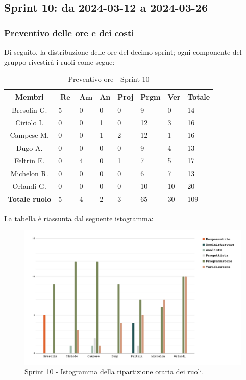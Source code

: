 \documentclass[10pt, a4paper]{article}
\begin{document}
\subsection{Sprint 10: da 2024-03-12 a 2024-03-26}

\subsubsection{Preventivo delle ore e dei costi}
Di seguito, la distribuzione delle ore del decimo sprint; ogni componente del gruppo rivestirà i ruoli come segue:
\begin{table}[H]
\begin{tabularx}{\textwidth}{c|X|X|X|X|X|X|X}
    \textbf{Membri} & $\operatorname{\textbf{Re}}$ & $\mathrm{\textbf{Am}}$ & \textbf{An} & \textbf{Proj} & \textbf{Prgm} & \textbf{Ver} & \textbf{Totale} \\
        \hline Bresolin G. & \cellcolor{primarycolor}5 & 0 & 0 & 0 & 9 & 0 & 14 \\
        \hline Ciriolo I.  & 0 & 0 & 1 & 0 & \cellcolor{primarycolor}12 & 3 & 16 \\
        \hline Campese M.  & 0 & 0 & 1 & 2 & \cellcolor{primarycolor}12 & 1 & 16 \\
        \hline Dugo A.     & 0 & 0 & 0 & 0 & \cellcolor{primarycolor}9 & 4 & 13 \\
        \hline Feltrin E.  & 0 & 4 & 0 & 1 & 7 & \cellcolor{primarycolor}5 & 17 \\
        \hline Michelon R. & 0 & 0 & 0 & 0 & 6 & \cellcolor{primarycolor}7 & 13 \\
        \hline Orlandi G.  & 0 & 0 & 0 & 0 & 10 & \cellcolor{primarycolor}10 & 20 \\
        \hline
        \textbf{Totale ruolo} & 5 & 4 & 2 & 3 & 65 & 30 & 109 
    \end{tabularx}
    \caption{Preventivo ore - Sprint 10}
    \end{table}

La tabella è riassunta dal seguente istogramma:
 \begin{figure}[H]
        \centering        
        \includegraphics[width=15.5cm]{istogrammi/istogramma_10_periodo.png}
        \caption{Sprint 10 - Istogramma della ripartizione oraria dei ruoli. }
    \end{figure}
\end{document}
